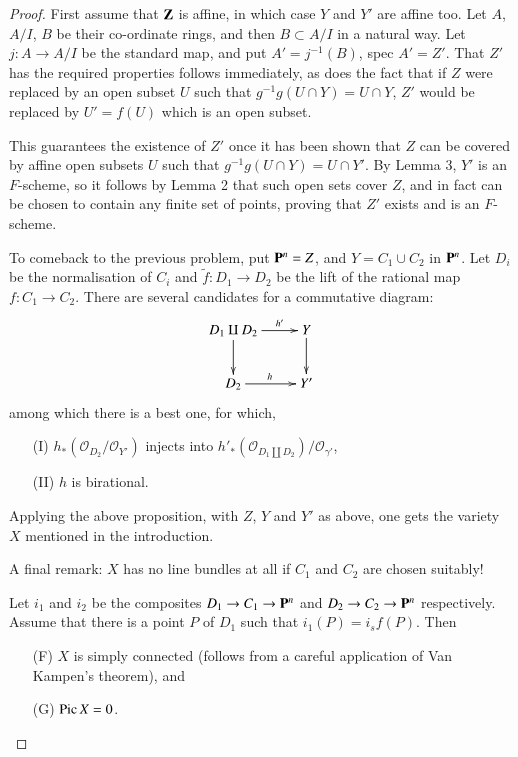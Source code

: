 \begin{proof}
First assume that $\mathbf{Z}$ is affine, in which case $Y$ and $Y'$ are affine too. Let $A$, $A/I$, $B$ be their co-ordinate rings, and then $B \subset A / I$ in a natural way. Let $j : A \to A / I$ be the standard map, and put $A' = j^{-1} (B)$, spec $A' = Z'$. That $Z'$ has the required properties follows immediately, as does the fact that if $Z$ were replaced by an open subset $U$ such that $g^{-1} g(U \cap Y) = U \cap Y$, $Z'$ would be replaced by $U' = f(U)$ which is an open subset. 

This guarantees the existence of $Z'$ once it has been shown that $Z$ can be covered by affine open subsets $U$ such that $g^{-1} g(U \cap Y) = U \cap Y'$. By Lemma 3, $Y'$ is an $F$-scheme, so it follows by Lemma 2 that such open sets cover $Z$, and in fact can be chosen to contain any finite set of points, proving that $Z'$ exists  and is an $F$-scheme.

To come\pageoriginale back to the previous problem, put $\mathbf{P}^n = Z$, and $Y = C_1 \cup C_2$ in $\mathbf{P}^n$. Let $D_i$ be the normalisation of $C_i$ and $\tilde{f}: D_1 \to D_2$ be the lift of the rational map $f: C_1 \to C_2$. There are several candidates for a commutative diagram:
\[
\xymatrix{
D_1 \amalg D_2 \ar[r]^-{h'} \ar[d] & Y \ar[d]\\
D_2 \ar[r]^h & Y' 
}
\]
among which there is a best one, for which,
\begin{itemize}
\item[(I)] $h_* (\mathcal{O}_{D_2}/ \mathcal{O}_{Y'})$ injects into $h'_* (\mathcal{O}_{D_1 \amalg D_2}) / \mathcal{O}_{\gamma'}$,

\item[(II)] $h$ is birational.
\end{itemize}

Applying the above proposition, with $Z$, $Y$ and $Y'$ as above, one gets the variety $X$ mentioned in the introduction.

A final remark: $X$ has no line bundles at all if $C_1$ and $C_2$ are chosen suitably!

Let $i_1$ and $i_2$ be the composites $D_1 \to C_1 \to \mathbf{P}^n$ and $D_2 \to C_2 \to \mathbf{P}^n$ respectively. Assume that there is a point $P$ of $D_1$ such that $i_1 (P) = i_s f(P)$. Then 
\begin{itemize}
\item[(F)] $X$ is simply connected (follows from a careful application of Van Kampen's theorem), and 

\item[(G)] $\operatorname{Pic} X = 0$.
\end{itemize}


\end{proof}
